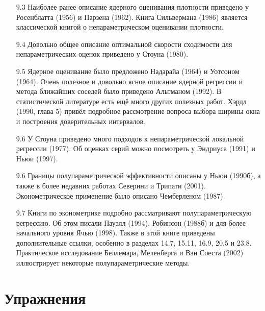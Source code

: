 \begin{itemize}
\item [$9.3$] Наиболее ранее описание ядерного оценивания плотности приведено у Росенблатта (1956) и Парзена (1962). Книга Сильвермана (1986) является классической книгой о непараметрическом оценивании плотности.
\item [$9.4$] Довольно общее описание оптимальной скорости сходимости для непараметрических оценок приведено у Стоуна (1980).
\item [$9.5$] Ядерное оценивание было предложено Надарайа (1964) и Уотсоном (1964). Очень полезное и довольно ясное описание ядерной регрессии и метода ближайших соседей было приведено Альтманом (1992). В статистической литературе есть ещё много других полезных работ. Хэрдл (1990, глава 5) привёл подробное рассмотрение вопроса выбора ширины окна и построения доверительных интервалов.
\item [$9.6$] У Стоуна приведено много подходов к непараметрической локальной регрессии (1977). Об оценках серий можно посмотреть у Эндриуса (1991) и Ньюи (1997). 
\item [$9.6$] Границы полупараметрической эффективности описаны у Ньюи (1990б), а также в более недавних работах Северини и Трипати (2001). Эконометрическое применение было описано Чемберленом (1987).
\item [$9.7$] Книги по эконометрике подробно рассматривают полупараметрическую регрессию. Об этом писали Пауэлл (1994), Робинсон (1988б) и для более начального уровня Ячью (1998). Также в этой книге приведены дополнительные ссылки, особенно в разделах 14.7, 15.11, 16.9, 20.5 и 23.8. Практическое исследование Беллемара, Меленберга и Ван Соеста (2002) иллюстрирует некоторые полупараметрические методы. 
\end{itemize}


\section{Упражнения}


